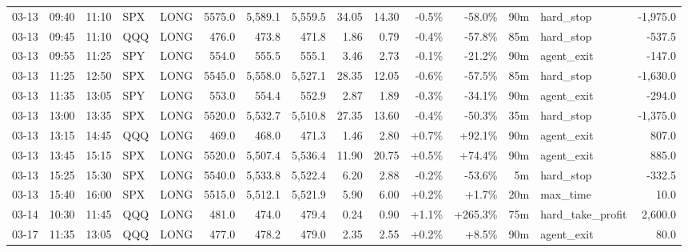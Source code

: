 \documentclass[11pt,a4paper,twoside]{article}
\begin{document}
\begin{landscape}
\begin{center}
\begin{longtable}{>{\color{txtmain}}l l l l l r r r r r r r r >{\color{txtmain}}l r}
03-13 & 09:40 & 11:10 & SPX & LONG & 5575.0 & 5,589.1 & 5,559.5 & 34.05 & 14.30 & \textcolor{lossred}{-0.5\%} & \textcolor{lossred}{-58.0\%} & 90m & hard\_stop & \textcolor{lossred}{-1,975.0} \\
03-13 & 09:45 & 11:10 & QQQ & LONG & 476.0 & 473.8 & 471.8 & 1.86 & 0.79 & \textcolor{lossred}{-0.4\%} & \textcolor{lossred}{-57.8\%} & 85m & hard\_stop & \textcolor{lossred}{-537.5} \\
03-13 & 09:55 & 11:25 & SPY & LONG & 554.0 & 555.5 & 555.1 & 3.46 & 2.73 & \textcolor{lossred}{-0.1\%} & \textcolor{lossred}{-21.2\%} & 90m & agent\_exit & \textcolor{lossred}{-147.0} \\
03-13 & 11:25 & 12:50 & SPX & LONG & 5545.0 & 5,558.0 & 5,527.1 & 28.35 & 12.05 & \textcolor{lossred}{-0.6\%} & \textcolor{lossred}{-57.5\%} & 85m & hard\_stop & \textcolor{lossred}{-1,630.0} \\
03-13 & 11:35 & 13:05 & SPY & LONG & 553.0 & 554.4 & 552.9 & 2.87 & 1.89 & \textcolor{lossred}{-0.3\%} & \textcolor{lossred}{-34.1\%} & 90m & agent\_exit & \textcolor{lossred}{-294.0} \\
03-13 & 13:00 & 13:35 & SPX & LONG & 5520.0 & 5,532.7 & 5,510.8 & 27.35 & 13.60 & \textcolor{lossred}{-0.4\%} & \textcolor{lossred}{-50.3\%} & 35m & hard\_stop & \textcolor{lossred}{-1,375.0} \\
03-13 & 13:15 & 14:45 & QQQ & LONG & 469.0 & 468.0 & 471.3 & 1.46 & 2.80 & \textcolor{wingreen}{+0.7\%} & \textcolor{wingreen}{+92.1\%} & 90m & agent\_exit & \textcolor{wingreen}{807.0} \\
03-13 & 13:45 & 15:15 & SPX & LONG & 5520.0 & 5,507.4 & 5,536.4 & 11.90 & 20.75 & \textcolor{wingreen}{+0.5\%} & \textcolor{wingreen}{+74.4\%} & 90m & agent\_exit & \textcolor{wingreen}{885.0} \\
03-13 & 15:25 & 15:30 & SPX & LONG & 5540.0 & 5,533.8 & 5,522.4 & 6.20 & 2.88 & \textcolor{lossred}{-0.2\%} & \textcolor{lossred}{-53.6\%} & 5m & hard\_stop & \textcolor{lossred}{-332.5} \\
03-13 & 15:40 & 16:00 & SPX & LONG & 5515.0 & 5,512.1 & 5,521.9 & 5.90 & 6.00 & \textcolor{wingreen}{+0.2\%} & \textcolor{wingreen}{+1.7\%} & 20m & max\_time & \textcolor{wingreen}{10.0} \\
03-14 & 10:30 & 11:45 & QQQ & LONG & 481.0 & 474.0 & 479.4 & 0.24 & 0.90 & \textcolor{wingreen}{+1.1\%} & \textcolor{wingreen}{+265.3\%} & 75m & hard\_take\_profit & \textcolor{wingreen}{2,600.0} \\
03-17 & 11:35 & 13:05 & QQQ & LONG & 477.0 & 478.2 & 479.0 & 2.35 & 2.55 & \textcolor{wingreen}{+0.2\%} & \textcolor{wingreen}{+8.5\%} & 90m & agent\_exit & \textcolor{wingreen}{80.0} \\

\end{longtable}
\end{center}
\end{landscape}
\end{document}

